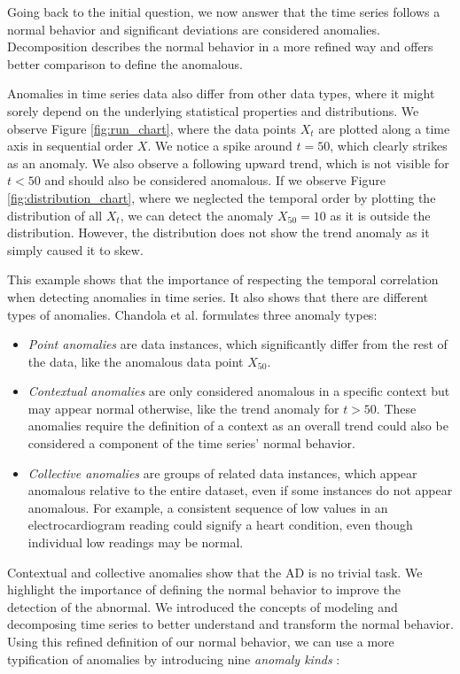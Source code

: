 Going back to the initial question, we now answer that the time series follows a normal behavior and significant deviations are considered anomalies. Decomposition describes the normal behavior in a more refined way and offers better comparison to define the anomalous.  


Anomalies in time series data also differ from other data types, where it might sorely depend on the underlying statistical properties and distributions. We observe Figure \ref{fig:run_chart}, where the data points $X_t$ are plotted along a time axis in sequential order $X$. We notice a spike around $t=50$, which clearly strikes as an anomaly. We also observe a following upward trend, which is not visible for $t<50$ and should also be considered anomalous. If we observe Figure \ref{fig:distribution_chart}, where we neglected the temporal order by plotting the distribution of all $X_t$, we can detect the anomaly $X_{50} = 10$ as it is outside the distribution. However, the distribution does not show the trend anomaly as it simply caused it to skew. 

This example shows that the importance of respecting the temporal correlation when detecting anomalies in time series. It also shows that there are different types of anomalies. Chandola et al. \cite{Chandola2009} formulates three anomaly types:

\begin{itemize}
    \item \textit{Point anomalies} are data instances, which significantly differ from the rest of the data, like the anomalous data point $X_{50}$.
    \item \textit{Contextual anomalies} are only considered anomalous in a specific context but may appear normal otherwise, like the trend anomaly for $t>50$. These anomalies require the definition of a context as an overall trend could also be considered a component of the time series' normal behavior. 
    \item \textit{Collective anomalies} are groups of related data instances, which appear anomalous relative to the entire dataset, even if some instances do not appear anomalous. For example, a consistent sequence of low values in an electrocardiogram reading could signify a heart condition, even though individual low readings may be normal.
\end{itemize}

Contextual and collective anomalies show that the AD is no trivial task. We highlight the importance of defining the normal behavior to improve the detection of the abnormal. We introduced the concepts of modeling and decomposing time series to better understand and transform the normal behavior. Using this refined definition of our normal behavior, we can use a more typification of anomalies by introducing nine \textit{anomaly kinds} \cite{Schmidl2022}:

